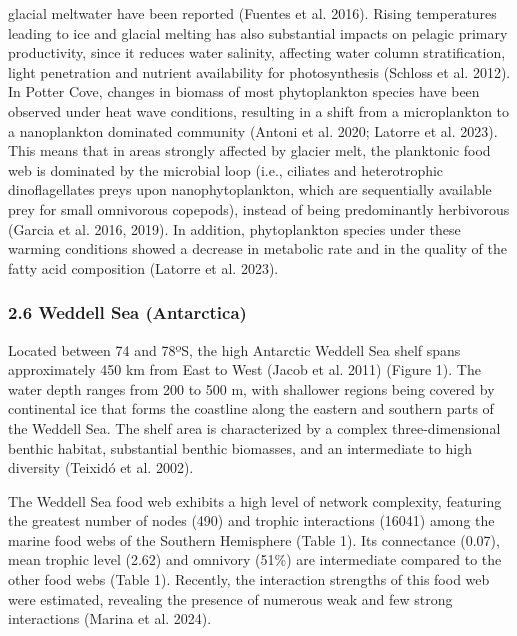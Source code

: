 \documentclass[
]{article}
\begin{document}
glacial meltwater have been reported (Fuentes et al. 2016). Rising
temperatures leading to ice and glacial melting has also substantial
impacts on pelagic primary productivity, since it reduces water
salinity, affecting water column stratification, light penetration and
nutrient availability for photosynthesis (Schloss et al. 2012). In
Potter Cove, changes in biomass of most phytoplankton species have been
observed under heat wave conditions, resulting in a shift from a
microplankton to a nanoplankton dominated community (Antoni et al. 2020;
Latorre et al. 2023). This means that in areas strongly affected by
glacier melt, the planktonic food web is dominated by the microbial loop
(i.e., ciliates and heterotrophic dinoflagellates preys upon
nanophytoplankton, which are sequentially available prey for small
omnivorous copepods), instead of being predominantly herbivorous (Garcia
et al. 2016, 2019). In addition, phytoplankton species under these
warming conditions showed a decrease in metabolic rate and in the
quality of the fatty acid composition (Latorre et al. 2023).

\subsubsection{2.6 Weddell Sea
(Antarctica)}\label{weddell-sea-antarctica}

Located between 74 and 78ºS, the high Antarctic Weddell Sea shelf spans
approximately 450 km from East to West (Jacob et al. 2011) (Figure 1).
The water depth ranges from 200 to 500 m, with shallower regions being
covered by continental ice that forms the coastline along the eastern
and southern parts of the Weddell Sea. The shelf area is characterized
by a complex three-dimensional benthic habitat, substantial benthic
biomasses, and an intermediate to high diversity (Teixidó et al. 2002).

The Weddell Sea food web exhibits a high level of network complexity,
featuring the greatest number of nodes (490) and trophic interactions
(16041) among the marine food webs of the Southern Hemisphere (Table 1).
Its connectance (0.07), mean trophic level (2.62) and omnivory (51\%)
are intermediate compared to the other food webs (Table 1). Recently,
the interaction strengths of this food web were estimated, revealing the
presence of numerous weak and few strong interactions (Marina et al.
2024).
\end{document}
